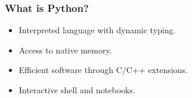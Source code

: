 \documentclass[%
]{beamer}
\begin{document}
\begin{frame}
\begin{tikzpicture}[x=\textwidth, y=\textheight]
        
    \end{tikzpicture}


\end{frame}


\begin{frame}
    \frametitle{What is Python?}
    \begin{itemize}
          \item<1-> Interpreted language with dynamic typing.
          \item<2-> Access to native memory.
          \item<3-> Efficient software through C/C++ extensions.
          \item<4-> Interactive shell and notebooks.
    \end{itemize}
\end{frame}
\end{document}
